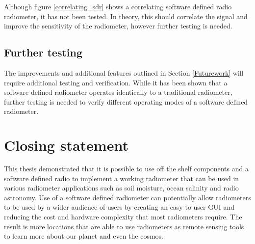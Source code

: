 Although figure \ref{correlating_sdr} shows a correlating software defined radio radiometer, it has not been tested.  In theory, this should correlate the signal and improve the sensitivity of the radiometer, however further testing is needed.

\subsection{Further testing}
The improvements and additional features outlined in Section \ref{Futurework} will require additional testing and verification.  While it has been shown that a software defined radiometer operates identically to a traditional radiometer, further testing is needed to verify different operating modes of a software defined radiometer.

\section{Closing statement}
This thesis demonstrated that it is possible to use off the shelf components and a software defined radio to implement a working radiometer that can be used in various radiometer applications such as soil moisture, ocean salinity and radio astronomy.  Use of a software defined radiometer can potentially allow radiometers to be used by a wider audience of users by creating an easy to user GUI and reducing the cost and hardware complexity that most radiometers require.  The result is more locations that are able to use radiometers as remote sensing tools to learn more about our planet and even the cosmos.
